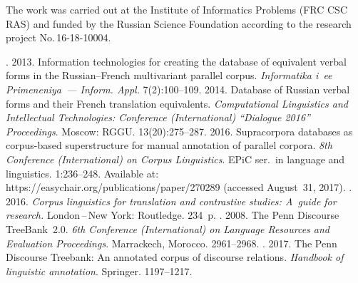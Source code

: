 \begin{multicols}{2}
  \Ack
  
  \vspace*{-2pt}
  
  \noindent
  The work was carried out at the Institute of Informatics Problems (FRC CSC RAS) and funded 
by the Russian Science Foundation according to the research project No.\,16-18-10004.
  
  \renewcommand{\bibname}{\protect\rmfamily References}
  
  \vspace*{-6pt}


{\small\frenchspacing
{%
\begin{thebibliography}{99}

\vspace*{-2pt}

  . 
2013. Information technologies for creating the database of equivalent verbal forms 
in the Russian--French multivariant parallel corpus. \textit{Informatika i~ee 
Primeneniya~--- Inform. Appl.} 7(2):100--109.
   2014. Database of Russian verbal forms and 
their French translation equivalents. \textit{Computational Linguistics and 
Intellectual Technologies: Conference (International) ``Dialogue 2016'' 
Proceedings}. Moscow: RGGU. 13(20):275--287.
   2016. Supracorpora databases as corpus-based 
superstructure for manual annotation of parallel corpora. \textit{8th 
Conference (International) on  Corpus Linguistics}. EPiC ser.\ in language and 
linguistics. 1:236--248. Available at: {\sf 
https://easychair.org/\linebreak publications/paper/270289} (accessed August~31, 2017).
  . 2016. \textit{Corpus linguistics for 
translation and contrastive studies: A~guide for research.}  
 London\,--\,New York: Routledge. 234~p.
  . 2008. The Penn Discourse TreeBank~2.0. \textit{6th Conference 
(International) on Language Resources and Evaluation Proceedings}. 
Marrackech, Morocco. 2961--2968.
  . 2017. The Penn Discourse Treebank: 
An annotated corpus of discourse relations. \textit{Handbook of linguistic 
annotation}. Springer. 1197--1217.

\end{thebibliography}}}
\end{multicols}
